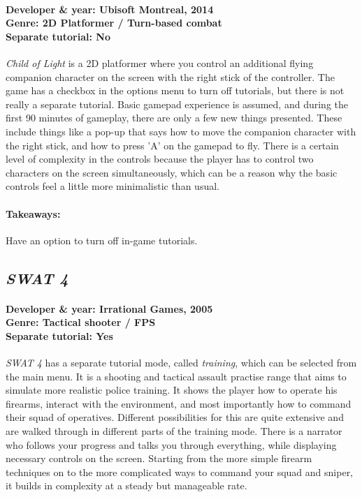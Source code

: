 \paragraph{Developer \& year: Ubisoft Montreal, 2014 \\ Genre: 2D Platformer / Turn-based combat \\ Separate tutorial: No \\}
\textit{Child of Light} is a 2D platformer where you control an additional flying companion character on the screen with the right stick of the controller. The game has a checkbox in the options menu to turn off tutorials, but there is not really a separate tutorial. Basic gamepad experience is assumed, and during the first 90 minutes of gameplay, there are only a few new things presented. These include things like a pop-up that says how to move the companion character with the right stick, and how to press 'A' on the gamepad to fly. There is a certain level of complexity in the controls because the player has to control two characters on the screen simultaneously, which can be a reason why the basic controls feel a little more minimalistic than usual.
\paragraph{Takeaways:}
Have an option to turn off in-game tutorials.

\subsection{\textit{SWAT 4}}
\paragraph{Developer \& year: Irrational Games, 2005 \\ Genre: Tactical shooter / FPS \\ Separate tutorial: Yes \\}
\textit{SWAT 4} has a separate tutorial mode, called \textit{training}, which can be selected from the main menu. It is a shooting and tactical assault practise range that aims to simulate more realistic police training. It shows the player how to operate his firearms, interact with the environment, and most importantly how to command their squad of operatives. Different possibilities for this are quite extensive and are walked through in different parts of the training mode. There is a narrator who follows your progress and talks you through everything, while displaying necessary controls on the screen. Starting from the more simple firearm techniques on to the more complicated ways to command your squad and sniper, it builds in complexity at a steady but manageable rate.
